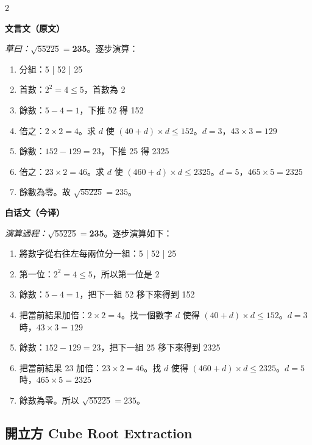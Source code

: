 \documentclass[11pt,a4paper]{article}
\newcommand{\LeftLabel}{\begin{center}\textcolor{sectioncolor}{\small\textbf{文言文（原文）}}\end{center}\vspace{-0.5em}}
\newcommand{\RightLabel}{\begin{center}\textcolor{sectioncolor}{\small\textbf{白话文（今译）}}\end{center}\vspace{-0.5em}}
\begin{document}
\begin{paracol}{2}
\LeftLabel
{\small
\textit{草曰：}$\sqrt{55225} = $\textbf{235}。逐步演算：
\begin{enumerate}[noitemsep,label=\arabic*.,leftmargin=1.5em]
\item 分組：5 | 52 | 25
\item 首數：$2^2 = 4 \le 5$，首數為 2
\item 餘數：$5-4=1$，下推 52 得 152
\item 倍之：$2 \times 2 = 4$。求 $d$ 使 $(40+d) \times d \le 152$。$d = 3$，$43 \times 3 = 129$
\item 餘數：$152 - 129 = 23$，下推 25 得 2325
\item 倍之：$23 \times 2 = 46$。求 $d$ 使 $(460+d) \times d \le 2325$。$d=5$，$465 \times 5 = 2325$
\item 餘數為零。故 $\sqrt{55225} = 235$。
\end{enumerate}
}

\switchcolumn
\RightLabel
{\small
\textit{演算過程：}$\sqrt{55225} = $\textbf{235}。逐步演算如下：
\begin{enumerate}[noitemsep,label=\arabic*.,leftmargin=1.5em]
\item 將數字從右往左每兩位分一組：5 | 52 | 25
\item 第一位：$2^2 = 4 \le 5$，所以第一位是 2
\item 餘數：$5 - 4 = 1$，把下一組 52 移下來得到 152
\item 把當前結果加倍：$2 \times 2 = 4$。找一個數字 $d$ 使得 $(40 + d) \times d \le 152$。$d = 3$ 時，$43 \times 3 = 129$
\item 餘數：$152 - 129 = 23$，把下一組 25 移下來得到 2325
\item 把當前結果 23 加倍：$23 \times 2 = 46$。找 $d$ 使得 $(460 + d) \times d \le 2325$。$d = 5$ 時，$465 \times 5 = 2325$
\item 餘數為零。所以 $\sqrt{55225} = 235$。
\end{enumerate}
}

\end{paracol}

\subsection*{開立方 Cube Root Extraction}
\end{document}
